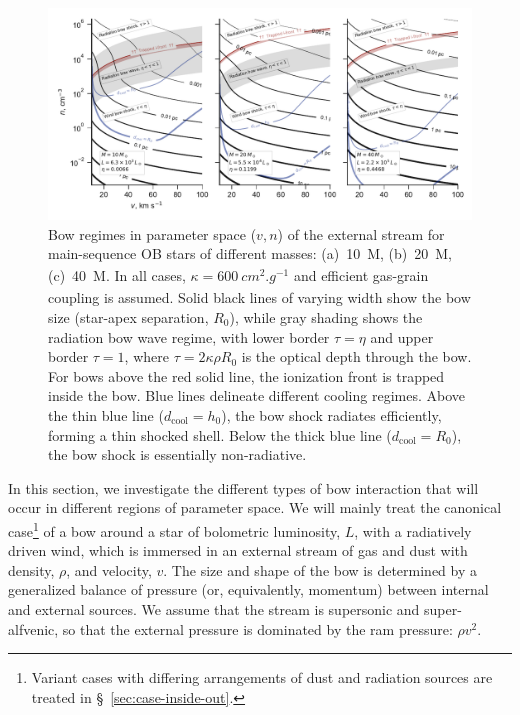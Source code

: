 \message{ !name(dusty-bow-wave.tex)}\documentclass[useAMS, usenatbib, a4paper]{mnras}
\begin{document}
\begin{figure}
  \includegraphics[width=\linewidth]{figs/zones-v-n-plane}
  \caption{Bow regimes in parameter space (\(v, n\)) of the external
    stream for main-sequence OB stars of different masses:
    (a)~\SI{10}{M_\odot}, (b)~\SI{20}{M_\odot}, (c)~\SI{40}{M_\odot}.  In all
    cases, \(\kappa = \SI{600}{cm^2.g^{-1}}\) and efficient gas-grain
    coupling is assumed. Solid black lines of varying width show the
    bow size (star-apex separation, \(R_0\)), while gray shading shows
    the radiation bow wave regime, with lower border \(\tau = \eta\) and
    upper border \(\tau = 1\), where \(\tau = 2 \kappa \rho R_0\) is the optical
    depth through the bow.  For bows above the red solid line, the
    ionization front is trapped inside the bow.  Blue lines delineate
    different cooling regimes.  Above the thin blue line
    (\(d_{\text{cool}} = h_0\)), the bow shock radiates efficiently,
    forming a thin shocked shell.  Below the thick blue line
    (\(d_{\text{cool}} = R_0\)), the bow shock is essentially
    non-radiative.}
  \label{fig:zones-v-n-plane}
\end{figure}

In this section, we investigate the different types of bow interaction
that will occur in different regions of parameter space. We will
mainly treat the canonical case\footnote{%
  Variant cases with differing arrangements of dust and radiation
  sources are treated in \S~\ref{sec:case-inside-out}.} %
of a bow around a star of bolometric luminosity, \(L\), with a
radiatively driven wind, which is immersed in an external stream of
gas and dust with density, \(\rho\), and velocity, \(v\).  The size and
shape of the bow is determined by a generalized balance of pressure
(or, equivalently, momentum) between internal and external sources.
We assume that the stream is supersonic and super-alfvenic, so that
the external pressure is dominated by the ram pressure: \(\rho v^2\).
\end{document}
